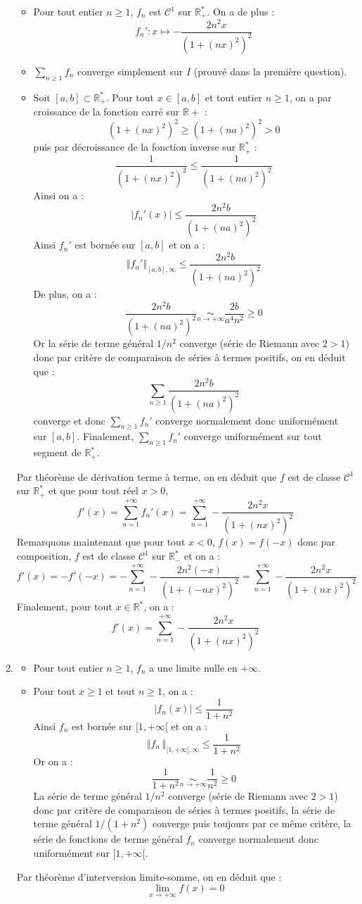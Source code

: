 \documentclass[a4paper,twoside,french,11pt]{VcCours}
\newcommand{\Sum}[2]{\sum_{#1}^{#2}}
\begin{document}
\begin{enumerate}
\begin{itemize}
\item Pour tout entier $n \geq 1$, $f_n$ est $\mathcal{C}^1$ sur $\mathbb{R}_+^{*}$. On a de plus :
$$f_n'  :  x\mapsto -\frac{2n^2x}{(1+(nx)^2)^2}$$
\item $\Sum{n \geq 1}{} f_n$ converge simplement sur $I$ (prouvé dans la première question).
\item Soit $[a,b]\subset \mathbb{R}_+^{*}$. Pour tout $x \in [a,b]$ et tout entier $n \geq 1$, on a par croissance de la fonction carré sur $\mathbb{R}+$ :
$$ (1+(nx)^2)^2 \geq (1+(na)^2)^2 >0$$
puis par décroissance de la fonction inverse sur $\mathbb{R}_+^{*}$ :
$$ \frac{1}{(1+(nx)^2)^2} \leq \frac{1}{(1+(na)^2)^2} $$
Ainsi on a :
$$ \vert f_n'(x) \vert \leq \frac{2n^2 b }{(1+(na)^2)^2}$$
Ainsi $f_n'$ est bornée sur $[a,b]$ et on a :
$$ \Vert f_n' \Vert_{[a,b], \infty} \leq  \frac{2n^2 b }{(1+(na)^2)^2}$$
De plus, on a :
$$ \frac{2n^2 b }{(1+(na)^2)^2} \underset{ n \rightarrow + \infty}{\sim} \frac{2b}{a^4n^2} \geq 0$$
Or la série de terme général $1/n^2$ converge (série de Riemann avec $2>1$) donc par critère de comparaison de séries à termes positifs, on en déduit que :
$$ \Sum{n \geq 1}{} \dfrac{2n^2 b }{(1+(na)^2)^2}$$
converge et donc $\Sum{n \geq 1}{} f_n'$ converge normalement donc uniformément sur $[a,b]$. Finalement, $\Sum{n \geq 1}{} f_n'$ converge uniformément sur tout segment de $\mathbb{R}_+^{*}$.
\end{itemize}
Par théorème de dérivation terme à terme, on en déduit que $f$ est de classe $\mathcal{C}^1$ sur $\mathbb{R}_+^*$ et que pour tout réel $x>0$,
$$f'(x) = \sum_{n=1}^{+\infty} f_n'(x) = \sum_{n=1}^{+\infty}  -\frac{2n^2x}{(1+(nx)^2)^2}$$
Remarquons maintenant que pour tout $x<0$, $f(x)=f(-x)$ donc par composition, $f$ est de classe $\mathcal{C}^1$ sur $\mathbb{R}_{-}^*$ et on a :
$$ f'(x) = -f'(-x) = -  \sum_{n=1}^{+\infty}  -\frac{2n^2(-x)}{(1+(-nx)^2)^2} =  \sum_{n=1}^{+\infty}  -\frac{2n^2x}{(1+(nx)^2)^2}$$
Finalement, pour tout $x \in \mathbb{R}^*$, on a :
$$f'(x)=  \sum_{n=1}^{+\infty}  -\frac{2n^2x}{(1+(nx)^2)^2}$$
\item 

 \begin{itemize}
\item  Pour tout entier $n \geq 1$, $f_n$ a une limite nulle en $+\infty$.
\item Pour tout $x \geq 1$ et tout $n \geq 1$, on a :
$$ \vert f_n(x) \vert \leq \frac{1}{1+n^2}$$
Ainsi $f_n$ est bornée sur $[1, + \infty[$ et on a :
$$ \Vert f_n\ \Vert_{[1,+\infty[, \infty}\leq \frac{1}{1+n^2} $$
Or on a :
$$ \frac{1}{1+n^2} \underset{n \rightarrow + \infty}{\sim} \frac{1}{n^2} \geq 0$$
La série de terme général $1/n^2$ converge (série de Riemann avec $2>1$) donc par critère de comparaison de séries à termes positifs, la série de terme général $1/(1+n^2)$ converge puis toujours par ce même critère, la série de fonctions de terme général $f_n$ converge normalement donc uniformément sur $[1, + \infty[$.
\end{itemize}
Par théorème d'interversion limite-somme, on en déduit que :
$$\lim_{x\rightarrow+\infty}f(x)=0$$


\end{enumerate}
\end{document}
